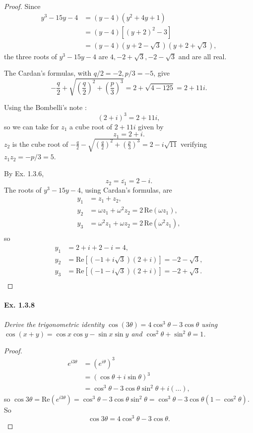 \documentclass[11pt,a4paper]{article}
\begin{document}
\begin{proof} Since
\begin{align*}
y^3-15y-4 &= (y-4)(y^2+4y+1)\\
&=(y-4)[(y+2)^2-3]\\
&=(y-4)(y+2-\sqrt{3})(y+2+\sqrt{3}),
\end{align*}
the three roots of $y^3-15y-4$ are $4,-2+\sqrt{3},-2-\sqrt{3}$ and are all real.

The Cardan's formulas, with $q/2 = -2,p/3=-5 $, give 
$$-\frac{q}{2}+ \sqrt{\left (\frac{q}{2}\right)^2+\left (\frac{p}{3}\right)^3} = 2 + \sqrt{4 - 125} = 2 + 11i.$$


Using the Bombelli's note :
$$(2+i)^3 = 2+11i,$$
so we can take for $z_1$ a cube root of $2+11i$ given by 
$$z_1 = 2+i.$$
$z_2$ is the cube root of $-\frac{q}{2}- \sqrt{\left (\frac{q}{2}\right)^2+\left (\frac{p}{3}\right)^3}= 2 - i \sqrt{11}$ verifying $z_1 z_2 = -p/3 = 5$. 

By Ex. 1.3.6,  $$z_2 = \overline{z_1} = 2 -i.$$
The roots of $y^3-15y-4$, using Cardan's formulas, are
\begin{align*}
y_1 &= z_1+ z_2,\\
y_2 &= \omega z_1 + \omega^2 z_2 = 2\, \mathrm{Re}(\omega z_1),\\
y_3 &= \omega^2 z_1 + \omega z_2 = 2\, \mathrm{Re}(\omega^2 z_1),\\
\end{align*}
so
\begin{align*}
y_1 &= 2+i + 2 -i = 4,\\
y_2 &=\mathrm{Re}[(-1+i\sqrt{3})(2+i)] = -2 - \sqrt{3},\\
y_3 &= \mathrm{Re}[(-1-i\sqrt{3})(2+i)] = -2 + \sqrt{3}.\\
\end{align*}
\end{proof}

\paragraph{Ex. 1.3.8}

{\it Derive the trigonometric identity $\cos(3\theta) = 4 \cos^3 \theta - 3 \cos \theta$ using ${\cos(x+y)} = \cos x \cos y - \sin x \sin y$ and $\cos^2 \theta + \sin^2 \theta = 1$.
}

\begin{proof}
\begin{align*}
e^{i3\theta} &= \left(e^{i\theta}\right)^3\\
&=(\cos \theta + i \sin \theta)^3\\
&= \cos^3 \theta - 3\cos \theta \sin^2 \theta + i (...),
\end{align*}
so $\cos 3 \theta = \mathrm{Re}(e^{i3\theta}) = \cos^3 \theta - 3\cos \theta \sin^2 \theta = \cos^3 \theta - 3\cos\theta (1-\cos^2 \theta) $.
So
$$\cos 3 \theta = 4 \cos^3 \theta - 3 \cos \theta.$$
\end{proof}
\end{document}
